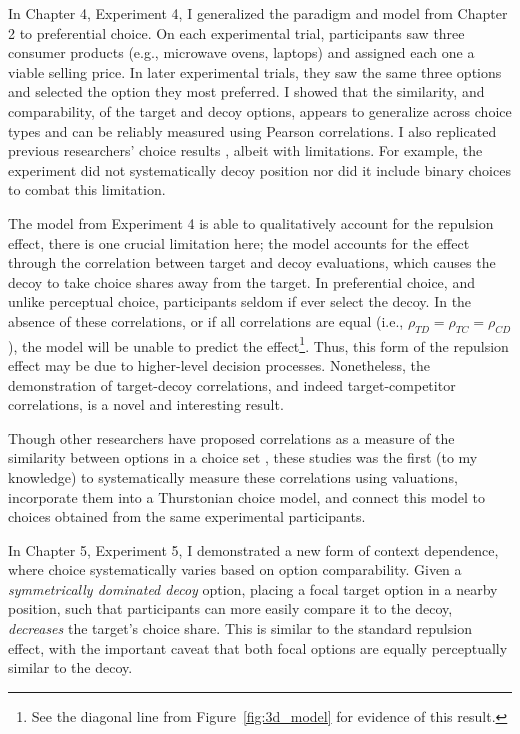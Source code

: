 In Chapter 4, Experiment 4, I generalized the paradigm and model from Chapter 2 to preferential choice. On each experimental trial, participants saw three consumer products (e.g., microwave ovens, laptops) and assigned each one a viable selling price. In later experimental trials, they saw the same three options and selected the option they most preferred. I showed that the similarity, and comparability, of the target and decoy options, appears to generalize across choice types and can be reliably measured using Pearson correlations.  I also replicated previous researchers' choice results \parencite{banerjeeFactorsThatPromote2024}, albeit with limitations. For example, the experiment did not systematically decoy position nor did it include binary choices to combat this limitation. 

The model from Experiment 4 is able to qualitatively account for the repulsion effect, there is one crucial limitation here; the model accounts for the effect through the correlation between target and decoy evaluations, which causes the decoy to take choice shares away from the target. In preferential choice, and unlike perceptual choice, participants seldom if ever select the decoy. In the absence of these correlations, or if all correlations are equal (i.e., $\rho_{TD}=\rho_{TC}=\rho_{CD}$), the model will be unable to predict the effect\footnote{See the diagonal line from Figure~\ref{fig:3d_model} for evidence of this result.}. Thus, this form of the repulsion effect may be due to higher-level decision processes. Nonetheless, the demonstration of target-decoy correlations, and indeed target-competitor correlations, is a novel and interesting result. 

Though other researchers have proposed correlations as a measure of the similarity between options in a choice set \parencite{kamakura1984predicting,natenzon2019random}, these studies was the first (to my knowledge) to systematically measure these correlations using valuations, incorporate them into a Thurstonian choice model, and connect this model to choices obtained from the same experimental participants.

In Chapter 5, Experiment 5, I demonstrated a new form of context dependence, where choice systematically varies based on option comparability. Given a \textit{symmetrically dominated decoy} option, placing a focal target option in a nearby position, such that participants can more easily compare it to the decoy, \textit{decreases} the target's choice share. This is similar to the standard repulsion effect, with the important caveat that both focal options are equally perceptually similar to the decoy. 

